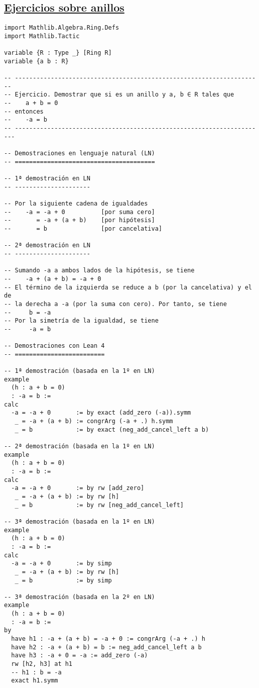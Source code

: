 \subsection{\href{./src/Basicos/Ejercicios\_sobre\_anillos.lean}{Ejercicios sobre anillos}}
\label{sec:org735afd9}
\begin{verbatim}
import Mathlib.Algebra.Ring.Defs
import Mathlib.Tactic

variable {R : Type _} [Ring R]
variable {a b : R}

-- ---------------------------------------------------------------------
-- Ejercicio. Demostrar que si es un anillo y a, b ∈ R tales que
--    a + b = 0
-- entonces
--    -a = b
-- ----------------------------------------------------------------------

-- Demostraciones en lenguaje natural (LN)
-- =======================================

-- 1ª demostración en LN
-- ---------------------

-- Por la siguiente cadena de igualdades
--    -a = -a + 0          [por suma cero]
--       = -a + (a + b)    [por hipótesis]
--       = b               [por cancelativa]

-- 2ª demostración en LN
-- ---------------------

-- Sumando -a a ambos lados de la hipótesis, se tiene
--    -a + (a + b) = -a + 0
-- El término de la izquierda se reduce a b (por la cancelativa) y el de
-- la derecha a -a (por la suma con cero). Por tanto, se tiene
--     b = -a
-- Por la simetría de la igualdad, se tiene
--     -a = b

-- Demostraciones con Lean 4
-- =========================

-- 1ª demostración (basada en la 1º en LN)
example
  (h : a + b = 0)
  : -a = b :=
calc
  -a = -a + 0       := by exact (add_zero (-a)).symm
   _ = -a + (a + b) := congrArg (-a + .) h.symm
   _ = b            := by exact (neg_add_cancel_left a b)

-- 2ª demostración (basada en la 1º en LN)
example
  (h : a + b = 0)
  : -a = b :=
calc
  -a = -a + 0       := by rw [add_zero]
   _ = -a + (a + b) := by rw [h]
   _ = b            := by rw [neg_add_cancel_left]

-- 3ª demostración (basada en la 1º en LN)
example
  (h : a + b = 0)
  : -a = b :=
calc
  -a = -a + 0       := by simp
   _ = -a + (a + b) := by rw [h]
   _ = b            := by simp

-- 3ª demostración (basada en la 2º en LN)
example
  (h : a + b = 0)
  : -a = b :=
by
  have h1 : -a + (a + b) = -a + 0 := congrArg (-a + .) h
  have h2 : -a + (a + b) = b := neg_add_cancel_left a b
  have h3 : -a + 0 = -a := add_zero (-a)
  rw [h2, h3] at h1
  -- h1 : b = -a
  exact h1.symm


\end{verbatim}
